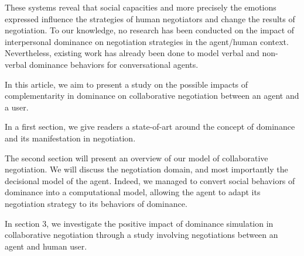 \documentclass[10pt, a4paper]{article} %
\begin{document}
	 These systems reveal that social capacities and more precisely the emotions expressed influence the strategies of human negotiators and change the results of negotiation. To our knowledge, no research has been conducted on the impact of interpersonal dominance on negotiation strategies in the agent/human context. 	 
	 Nevertheless, existing work has already been done to model verbal and non-verbal dominance behaviors for conversational agents. 
	 
	
	In this article, we aim to present a study on the possible impacts of complementarity in dominance on collaborative negotiation between an agent and a user.
	
	In a first section, we give readers a state-of-art around the concept of dominance and its manifestation in negotiation. 
	
	The second section will present an overview of our model of collaborative negotiation. We will discuss the negotiation domain, and most importantly the decisional model of the agent. Indeed, we managed to convert social behaviors of dominance into a computational model, allowing the agent to adapt its negotiation strategy to its behaviors of dominance.
	
	In section 3, we investigate the positive impact of dominance simulation in collaborative negotiation through a study involving negotiations between an agent and human user.
	
\end{document}
